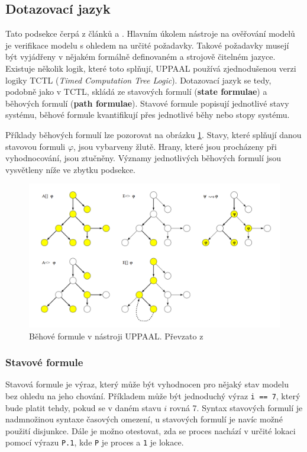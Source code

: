 \subsection{Dotazovací jazyk} \label{uppaal_query_lang}
Tato podsekce čerpá z článků \cite{uppaal_intro} a \cite{uppaal_smc}. Hlavním úkolem nástroje na ověřování modelů je verifikace modelu s ohledem na určité požadavky. Takové požadavky musejí být vyjádřeny v nějakém formálně definovaném a strojově čitelném jazyce. Existuje několik logik, které toto splňují, UPPAAL používá zjednodušenou verzi logiky TCTL (\textit{Timed Computation Tree Logic}). Dotazovací jazyk se tedy, podobně jako v TCTL, skládá ze stavových formulí (\textbf{state formulae}) a běhových formulí (\textbf{path formulae}). Stavové formule popisují jednotlivé stavy systému, běhové formule kvantifikují přes jednotlivé běhy nebo stopy systému.

Příklady běhových formulí lze pozorovat na obrázku \ref{fig:uppaal_path_form}. Stavy, které splňují danou stavovou formuli $\varphi$, jsou vybarveny žlutě. Hrany, které jsou procházeny při vyhodnocování, jsou ztučněny. Významy jednotlivých běhových formulí jsou vysvětleny níže ve zbytku podsekce.

\begin{figure}[H]
    \centering
    \includegraphics[width=\textwidth]{obrazky-figures/uppaal_path_form.png}
    \caption{Běhové formule v nástroji UPPAAL. Převzato z \cite{uppaal_intro}}
    \label{fig:uppaal_path_form}
\end{figure}

\subsubsection{Stavové formule}
Stavová formule je výraz, který může být vyhodnocen pro nějaký stav modelu bez ohledu na jeho chování. Příkladem může být jednoduchý výraz \texttt{i == 7}, který bude platit tehdy, pokud se v daném stavu $i$ rovná 7. Syntax stavových formulí je nadmnožinou syntaxe časových omezení, u stavových formulí je navíc možné použití disjunkce. Dále je možno otestovat, zda se proces nachází v určité lokaci pomocí výrazu \texttt{P.1}, kde \texttt{P} je proces a \texttt{1} je lokace.

